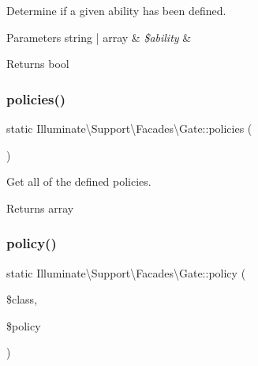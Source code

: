 Determine if a given ability has been defined.


\begin{DoxyParams}[1]{Parameters}
string | array & {\em \$ability} & \\
\hline
\end{DoxyParams}
\begin{DoxyReturn}{Returns}
bool 
\end{DoxyReturn}
\mbox{\label{class_illuminate_1_1_support_1_1_facades_1_1_gate_a2ef6d819da6742b6b4d12236517c4928}} 
\subsubsection{\texorpdfstring{policies()}{policies()}}
{\footnotesize\ttfamily static Illuminate\textbackslash{}\+Support\textbackslash{}\+Facades\textbackslash{}\+Gate\+::policies (\begin{DoxyParamCaption}{ }\end{DoxyParamCaption})\hspace{0.3cm}{\ttfamily [static]}}

Get all of the defined policies.

\begin{DoxyReturn}{Returns}
array 
\end{DoxyReturn}
\mbox{\label{class_illuminate_1_1_support_1_1_facades_1_1_gate_ac9b97caa9e0f2149bf81706cffaaa49d}} 
\subsubsection{\texorpdfstring{policy()}{policy()}}
{\footnotesize\ttfamily static Illuminate\textbackslash{}\+Support\textbackslash{}\+Facades\textbackslash{}\+Gate\+::policy (\begin{DoxyParamCaption}\item[{}]{\$class,  }\item[{}]{\$policy }\end{DoxyParamCaption})\hspace{0.3cm}{\ttfamily [static]}}


